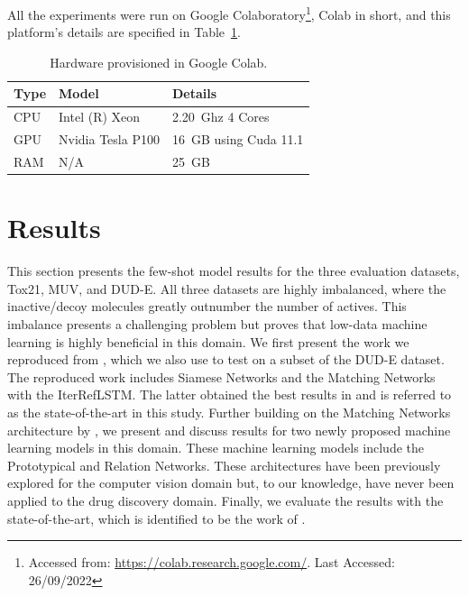 \documentclass[journal=jcisd8,manuscript=article]{achemso} %
\begin{document}
All the experiments were run on Google Colaboratory\footnote{Accessed from: \url{https://colab.research.google.com/}. Last Accessed: 26/09/2022}, Colab in short, and this platform's details are specified in Table~\ref{tab:hardware}.

\begin{table}
    \centering
    \begin{tabular}{@{}lll@{}}
        \hline
        \textbf{Type} & \textbf{Model} & \textbf{Details} \\
        \hline
        CPU & Intel (R) Xeon & 2.20~Ghz 4 Cores \\
        GPU & Nvidia Tesla P100 & 16~GB using Cuda 11.1 \\
        RAM & N/A & 25~GB \\
        \hline
    \end{tabular}
    \caption{Hardware provisioned in Google Colab.}
    \label{tab:hardware}
\end{table}

\section{Results}

This section presents the few-shot model results for the three evaluation datasets, Tox21, MUV, and DUD-E. All three datasets are highly imbalanced, where the inactive/decoy molecules greatly outnumber the number of actives. This imbalance presents a challenging problem but proves that low-data machine learning is highly beneficial in this domain. We first present the work we reproduced from \citet{altae2017low}, which we also use to test on a subset of the DUD-E dataset. The reproduced work includes Siamese Networks \citep{koch2015siamese} and the Matching Networks \citep{vinyals2016matching} with the IterRefLSTM. The latter obtained the best results in \citet{altae2017low} and is referred to as the state-of-the-art in this study. Further building on the Matching Networks architecture by \citet{vinyals2016matching}, we present and discuss results for two newly proposed machine learning models in this domain. These machine learning models include the Prototypical \citep{snell2017prototypical} and Relation \citep{sung2018learning} Networks. These architectures have been previously explored for the computer vision domain but, to our knowledge, have never been applied to the drug discovery domain. Finally, we evaluate the results with the state-of-the-art, which is identified to be the work of \citet{altae2017low}.
\end{document}
